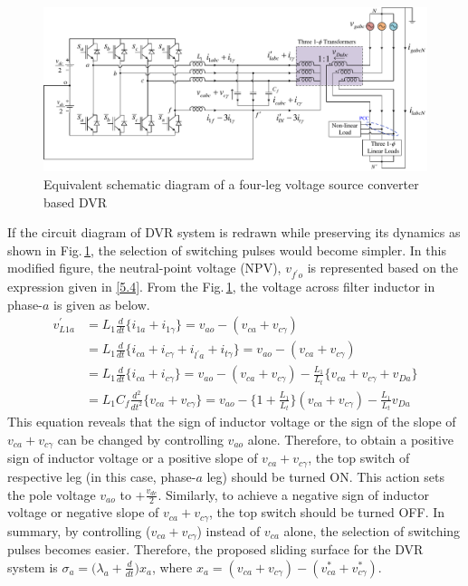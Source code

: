 \begin{figure}[]\centering
	\includegraphics[scale=0.6	]{figures/Appendix/4leg_DVR1.pdf}
	\caption{\small Equivalent schematic diagram of a four-leg voltage source converter based DVR} %
	\label{A1.fig2}
\end{figure} 
If the circuit diagram of DVR system is redrawn while preserving its dynamics as shown in Fig.\,\ref{A1.fig2}, the selection of switching pulses would become simpler. In this modified figure, the neutral-point voltage (NPV), $v_{f^\prime o}$ is represented based on the expression given in \eqref{5.4}. From the Fig.\,\ref{A1.fig2}, the voltage across filter inductor in phase-$a$ is given as below.
\begin{equation}
\begin{aligned}
v^\prime_{L1a} &= L_{1}\frac{d}{dt} \Big\{i_{1a} + i_{1\gamma} \Big\} = v_{ao}  - (v_{ca} + v_{c\gamma}) \\
               &= L_{1}\frac{d}{dt} \Big\{i_{ca} + i_{c\gamma} + i_{l^{\prime}a} + i_{t\gamma} \Big\}  = v_{ao}  - (v_{ca} + v_{c\gamma}) \\
&= L_{1}\frac{d}{dt} \Big\{ i_{ca} + i_{c\gamma} \Big\} = v_{ao}  - (v_{ca} + v_{c\gamma}) - \frac{L_1}{L_t} \Big\{ v_{ca} + v_{c\gamma} + v_{Da} \Big\} \\
&= L_{1}C_f\frac{d^2}{dt^2} \Big\{ v_{ca} + v_{c\gamma} \Big\} = v_{ao} - \Big\{ 1 + \frac{L_1}{L_t} \Big\} (v_{ca} + v_{c\gamma}) -  \frac{L_1}{L_t} v_{Da}  
\end{aligned}
\end{equation}
This equation reveals that the sign of inductor voltage or the sign of the slope of $v_{ca} + v_{c\gamma}$ can be changed by controlling $v_{ao}$ alone. Therefore, to obtain a positive sign of inductor voltage or a positive slope of $v_{ca} + v_{c\gamma}$, the top switch of respective leg (in this case, phase-$a$ leg) should be turned ON. This action sets the pole voltage $v_{ao}$ to $+\frac{v_{dc}}{2}$. Similarly, to achieve a negative sign of inductor voltage or negative slope of $v_{ca} + v_{c\gamma}$, the top switch should be turned OFF.
In summary, by controlling ($v_{ca} + v_{c\gamma}$) instead of $v_{ca}$ alone, the selection of switching pulses becomes easier. Therefore, the proposed sliding surface for the DVR system is $\sigma_{a} = \Big(\lambda_a + \frac{d}{dt}\Big) x_a$, where $x_a = (v_{ca} + v_{c\gamma}) - (v^*_{ca} + v^*_{c\gamma})$. 